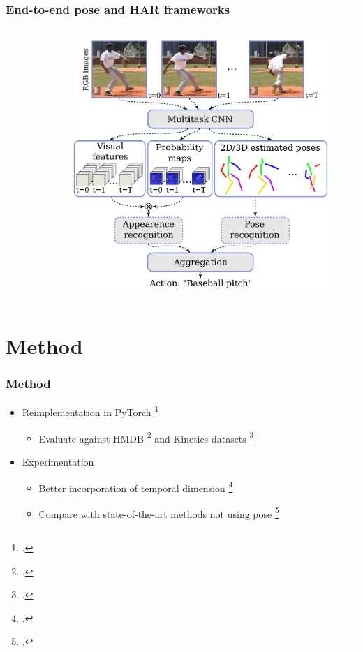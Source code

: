 \documentclass[9pt]{beamer}
\providecommand{\fcite}[1]{\footcite{#1}}
\newenvironment{myframe}[1][]{%
\begin{frame}%
\frametitle{#1}
\setcounter{footnote}{0}


}{%
\end{frame}%
}
\begin{document}
\begin{myframe}[End-to-end pose and HAR frameworks]
\begin{columns}[T]
\begin{column}{.45\textwidth}
\begin{figure}
		\end{figure}
	\end{column}
	\begin{column}{.45\textwidth}
		\begin{figure}
			\includegraphics[width=.99\textwidth]{endtoend-concept.png}
		\end{figure}
	\end{column}
	\end{columns}
\end{myframe}

\section{Method}
\begin{myframe}[Method]
    \begin{itemize}
        \item Reimplementation in PyTorch \fcite{paszke_automatic_2017}
        \begin{itemize}
            \item Evaluate against HMDB \fcite{kuehne_hmdb:_2011} and Kinetics datasets \fcite{kay_kinetics_2017}
        \end{itemize}
        \item Experimentation
        \begin{itemize}
            \item Better incorporation of temporal dimension \fcite{pavllo_3d_2019}
            \item Compare with state-of-the-art methods not using pose \fcite{zhou_mict:_2018}
        \end{itemize}
    \end{itemize}
\end{myframe}
\end{document}
